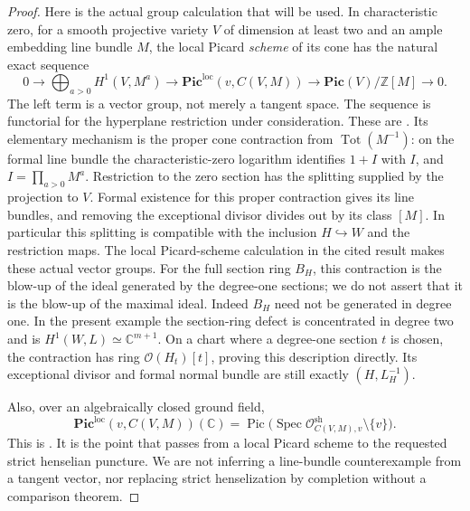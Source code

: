 \begin{proof}
Here is the actual group calculation that will be used.
In characteristic zero, for a smooth projective variety
$V$ of dimension at least two and an ample embedding
line bundle $M$, the local Picard \emph{scheme} of its
cone has the natural exact sequence
\begin{equation}\label{eq:C3-Kollar-cone}
 0\longrightarrow\bigoplus_{a>0}H^1(V,M^a)
  \longrightarrow\mathbf{Pic}^{\mathrm{loc}}(v,C(V,M))
  \longrightarrow\mathbf{Pic}(V)/\mathbb Z[M]
  \longrightarrow0.
\end{equation}
The left term is a vector group, not merely a tangent
space. The sequence is functorial for the hyperplane
restriction under consideration. These are
\citet[Example 4.2, equations (4.2.3)--(4.2.4),
p.~470]{D_Kollar2016LocalPicard}.
Its elementary mechanism is the proper cone contraction
from $\operatorname{Tot}(M^{-1})$:
on the formal line bundle the characteristic-zero
logarithm identifies $1+I$ with $I$, and
$I=\prod_{a>0}M^a$. Restriction to the zero section has
the splitting supplied by the projection to $V$.
Formal existence for this proper contraction gives its line
bundles, and removing the exceptional divisor divides
out by its class $[M]$. In particular this splitting
is compatible with the inclusion $H\hookrightarrow W$ and the
restriction maps. The local Picard-scheme calculation
in the cited result makes these actual vector groups.
For the full section ring $B_H$, this contraction is
the blow-up of the ideal generated by the degree-one
sections; we do not assert that it is the blow-up of
the maximal ideal. Indeed $B_H$ need not be generated
in degree one. In the present example the section-ring
defect is concentrated in degree two and is
$H^1(W,L)\simeq\mathbb C^{m+1}$. On a chart where a
degree-one section $t$ is chosen, the contraction has
ring $\mathcal O(H_t)[t]$, proving this description
directly. Its exceptional divisor and formal normal
bundle are still exactly $(H,L_H^{-1})$.

Also, over an algebraically closed ground field,
\begin{equation}\label{eq:C3-henselian-Picard}
 \mathbf{Pic}^{\mathrm{loc}}(v,C(V,M))(\mathbb C)
   =\operatorname{Pic}
       \bigl(\operatorname{Spec}\mathcal O^{\mathrm{sh}}_{C(V,M),v}
                                                     \setminus\{v\}\bigr).
\end{equation}
This is \citet[Section 3.5, p.~469]{D_Kollar2016LocalPicard}.
It is the point that passes from a local Picard scheme
to the requested strict henselian puncture. We are
not inferring a line-bundle counterexample from a
tangent vector, nor replacing strict henselization
by completion without a comparison theorem.


\end{proof}
